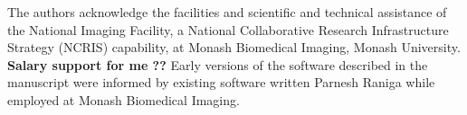 \begin{acknowledgements}
The authors acknowledge the facilities and scientific and technical assistance
of the National Imaging Facility, a National Collaborative Research
Infrastructure Strategy (NCRIS) capability, at Monash Biomedical Imaging,
Monash University. \textbf{Salary support for me ??} Early versions of the software described in the manuscript
were informed by existing software written Parnesh Raniga while
employed at Monash Biomedical Imaging.
\end{acknowledgements}


%
%



